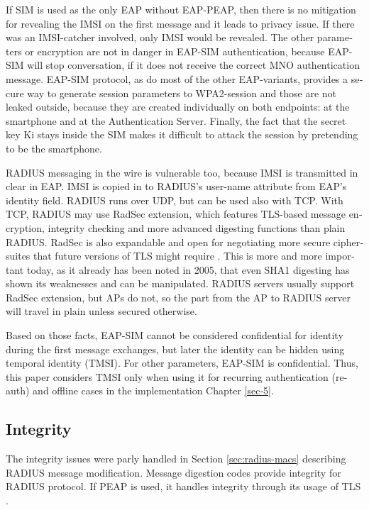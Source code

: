 \documentclass[12pt,a4paper,english]{tutthesis}
\begin{document}
\begin{otherlanguage}{english}
If SIM is used as the only EAP without EAP-PEAP, then there is no
mitigation for revealing the IMSI on the first message and it leads to
privacy issue.  If there was an IMSI-catcher involved, only IMSI would
be revealed.  The other parameters or encryption are not in danger in
EAP-SIM authentication, because EAP-SIM will stop conversation, if it
does not receive the correct MNO authentication message.  EAP-SIM
protocol, as do most of the other EAP-variants, provides a secure way
to generate session parameters to WPA2-session and those are not
leaked outside, because they are created individually on both
endpoints: at the smartphone and at the Authentication Server.
Finally, the fact that the secret key Ki stays inside the SIM makes it
difficult to attack the session by pretending to be the smartphone.






RADIUS messaging in the wire is vulnerable too, because IMSI is transmitted in clear 
in EAP. IMSI is copied in to RADIUS's user-name attribute from EAP's identity field.
RADIUS runs over UDP, but can be used also with TCP. With TCP, RADIUS
may use RadSec extension, which features TLS-based message encryption,
integrity checking and more advanced digesting functions than plain
RADIUS.
RadSec is also expandable and open 
for negotiating more secure ciphersuites that future 
versions of TLS might require \cite{rfc6614}. This is
more and more important today, as it already has been noted in 2005,
that even SHA1 digesting has shown its weaknesses and can be manipulated.
RADIUS servers usually support RadSec extension, but APs do not, so 
the part from the AP to RADIUS server will travel in plain unless
secured otherwise.


Based on those facts, EAP-SIM cannot be considered confidential for identity
during the first message exchanges, but later the identity can be hidden
using temporal identity (TMSI). 
For other parameters, EAP-SIM is confidential.
Thus, this paper considers TMSI only when using it for recurring
authentication (re-auth) and offline cases in the implementation Chapter
\ref{sec-5}.
\subsection{Integrity}
\label{sec-6-1-2}



The integrity issues were parly handled in Section \ref{sec:radius-macs} describing
RADIUS message modification.
Message digestion codes provide integrity for RADIUS protocol.
If PEAP is used, it handles integrity through its usage of
 TLS \cite{peap}.


\end{otherlanguage}
\end{document}
